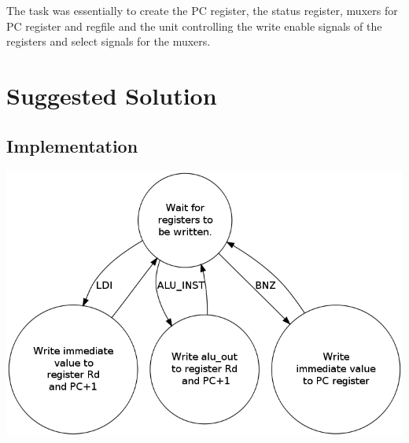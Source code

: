 \documentclass[10pt]{article}
\begin{document}
	The task was essentially to create the PC register, the status register, muxers for PC register and regfile and the unit controlling the write enable signals of the registers and select signals for the muxers. 

	\section*{Suggested Solution}


	\subsection*{Implementation}

	

	\begin{center}
	\includegraphics[width=.75\linewidth]{state_diagram.png} \\
	\end{center}
\end{document}
